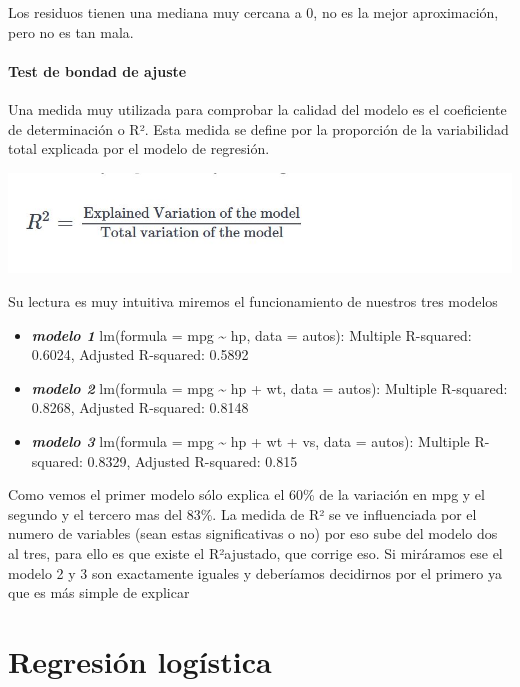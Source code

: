 \documentclass[
]{book}
\begin{document}
Los residuos tienen una mediana muy cercana a 0, no es la mejor aproximación, pero no es tan mala.

\hypertarget{test-de-bondad-de-ajuste}{%
\subsubsection{Test de bondad de ajuste}\label{test-de-bondad-de-ajuste}}

Una medida muy utilizada para comprobar la calidad del modelo es el coeficiente de determinación o R². Esta medida se define por la proporción de la variabilidad total explicada por el modelo de regresión.

\includegraphics[width=12.58in]{img/reg}

Su lectura es muy intuitiva
miremos el funcionamiento de nuestros tres modelos

\begin{itemize}
\item
  \textbf{\emph{modelo 1}} lm(formula = mpg \textasciitilde{} hp, data = autos): Multiple R-squared: 0.6024, Adjusted R-squared: 0.5892
\item
  \textbf{\emph{modelo 2}} lm(formula = mpg \textasciitilde{} hp + wt, data = autos): Multiple R-squared: 0.8268, Adjusted R-squared: 0.8148
\item
  \textbf{\emph{modelo 3}} lm(formula = mpg \textasciitilde{} hp + wt + vs, data = autos): Multiple R-squared: 0.8329, Adjusted R-squared: 0.815
\end{itemize}

Como vemos el primer modelo sólo explica el 60\% de la variación en mpg y el segundo y el tercero mas del 83\%. La medida de R² se ve influenciada por el numero de variables (sean estas significativas o no) por eso sube del modelo dos al tres, para ello es que existe el R²ajustado, que corrige eso. Si miráramos ese el modelo 2 y 3 son exactamente iguales y deberíamos decidirnos por el primero ya que es más simple de explicar

\hypertarget{regresiuxf3n-loguxedstica}{%
\chapter{Regresión logística}\label{regresiuxf3n-loguxedstica}}
\end{document}
